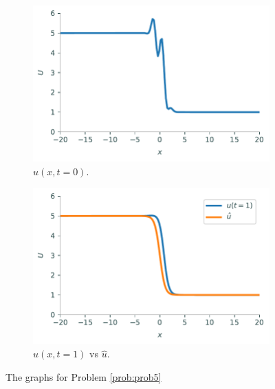 \begin{problem}
\begin{figure}[H]
\centering
\begin{subfigure}{.49\textwidth}
\centering
\includegraphics[width=\linewidth]{figures/prob5_initial.pdf}
\caption{$u(x,t=0)$.}
\end{subfigure}
%
\begin{subfigure}{.49\textwidth}
\centering
\includegraphics[width=\linewidth]{figures/prob5_ufinal_utilda.pdf}
\caption{$u(x,t = 1)$ vs $\hat{u}$.}
\end{subfigure}
\caption{The graphs for Problem \ref{prob:prob5}}
\label{fig:prob5}
\end{figure}
\end{problem}
